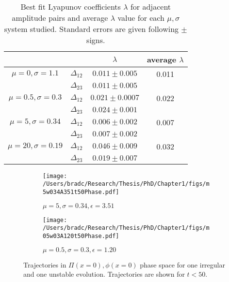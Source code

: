 \documentclass[../PhD.tex]{subfiles}
\begin{document}
\begin{table}[!t]
\begin{center}
\begin{tabular}{|cc|c|c|}
\hline
&&$\lambda$ &average $\lambda$\\
\hline
$\mu=0,\sigma=1.1$ & $\Delta_{12}$ &$0.011\pm 0.005$ & 0.011\\
&$\Delta_{23}$ & $0.011\pm 0.005$ & \\
\hline
$\mu=0.5,\sigma=0.3$ & $\Delta_{12}$ &$0.021\pm 0.0007$ & 0.022\\
&$\Delta_{23}$ & $0.024\pm 0.001$ & \\
\hline
$\mu=5,\sigma=0.34$ & $\Delta_{12}$ &$0.006\pm 0.002$& 0.007\\
&$\Delta_{23}$ & $0.007\pm 0.002$& \\
\hline
$\mu=20,\sigma=0.19$ & $\Delta_{12}$ &$0.046\pm 0.009$& 0.032\\
&$\Delta_{23}$ & $0.019\pm 0.007$ & \\
\hline
\end{tabular}
\end{center}
\caption[Best fit Lyapunov coefficients]{Best fit Lyapunov coefficients $\lambda$ for adjacent amplitude
pairs and average $\lambda$ value for each $\mu,\sigma$ system studied.
Standard errors are given following $\pm$ signs.}
\label{t:lyap}
\end{table}

\begin{figure}[!t]
\centering
\begin{subfigure}[t]{0.47\textwidth}
\texttt{[image: /Users/bradc/Research/Thesis/PhD/Chapter1/figs/m5w034A351t50Phase.pdf]}
\caption{$\mu=5,\sigma=0.34,\epsilon=3.51$}
\label{f:m5w034phase}
\end{subfigure}\hfill
\begin{subfigure}[t]{0.47\textwidth}
\texttt{[image: /Users/bradc/Research/Thesis/PhD/Chapter1/figs/m05w03A120t50Phase.pdf]}
\caption{$\mu=0.5,\sigma=0.3,\epsilon=1.20$}
\label{f:m05w03phase}
\end{subfigure}
\caption[Phase space trajectories for irregular and unstable initial data]{Trajectories in $\Pi(x=0),\phi(x=0)$ phase space for one irregular
and one unstable evolution. Trajectories are shown for $t<50$.}
\label{f:chaosphasespace}
\end{figure}
\end{document}
